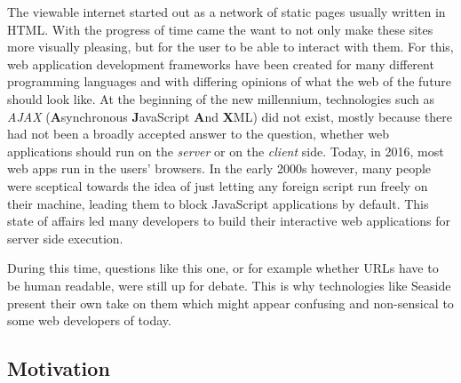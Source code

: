 \documentclass[a4paper,12pt,pagesize,headsepline,titlepage]{scrartcl}
\begin{document}
The viewable internet started out as a network of static pages usually written in HTML. With the progress of time came the want to not only make these sites more visually pleasing, but for the user to be able to interact with them. For this, web application development frameworks have been created for many different programming languages and with differing opinions of what the web of the future should look like. At the beginning of the new millennium, technologies such as \emph{AJAX} (\textbf{A}synchronous \textbf{J}avaScript \textbf{A}nd \textbf{X}ML) did not exist, mostly because there had not been a broadly accepted answer to the question, whether web applications should run on the \emph{server} or on the \emph{client} side. Today, in 2016, most web apps run in the users' browsers. In the early 2000s however, many people were sceptical towards the idea of just letting any foreign script run freely on their machine, leading them to block JavaScript applications by default. This state of affairs led many developers to build their interactive web applications for server side execution. 

During this time, questions like this one, or for example whether URLs have to be human readable, were still up for debate. This is why technologies like Seaside present their own take on them which might appear confusing and non-sensical to some web developers of today. 


\subsection{Motivation}
\label{sec:motivation} 
\medskip

\bigskip
\end{document}
